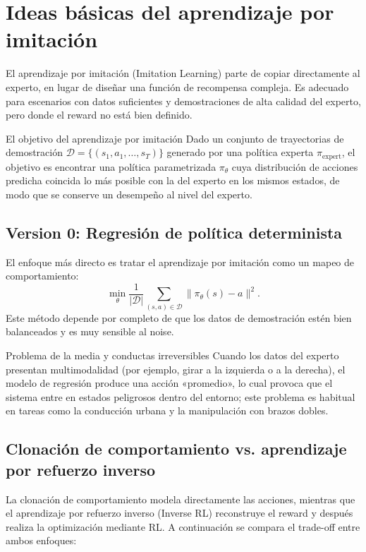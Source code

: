 \section{Ideas básicas del aprendizaje por imitación}

El aprendizaje por imitación (Imitation Learning) parte de copiar directamente al experto, en lugar de diseñar una función de recompensa compleja. Es adecuado para escenarios con datos suficientes y demostraciones de alta calidad del experto, pero donde el reward no está bien definido.

\begin{importantbox}{El objetivo del aprendizaje por imitación}
Dado un conjunto de trayectorias de demostración $\mathcal{D} = \{(s_1,a_1,\ldots,s_T)\}$ generado por una política experta $\pi_{\text{expert}}$, el objetivo es encontrar una política parametrizada $\pi_\theta$ cuya distribución de acciones predicha coincida lo más posible con la del experto en los mismos estados, de modo que se conserve un desempeño al nivel del experto.
\end{importantbox}

\subsection{Version 0: Regresión de política determinista}

El enfoque más directo es tratar el aprendizaje por imitación como un mapeo de comportamiento:
$$\min_\theta \frac{1}{|\mathcal{D}|}\sum_{(s,a) \in \mathcal{D}} \|\pi_\theta(s) - a\|^2.$$
Este método depende por completo de que los datos de demostración estén bien balanceados y es muy sensible al noise.

\begin{warningbox}{Problema de la media y conductas irreversibles}
Cuando los datos del experto presentan multimodalidad (por ejemplo, girar a la izquierda o a la derecha), el modelo de regresión produce una acción «promedio», lo cual provoca que el sistema entre en estados peligrosos dentro del entorno; este problema es habitual en tareas como la conducción urbana y la manipulación con brazos dobles.
\end{warningbox}

\subsection{Clonación de comportamiento vs. aprendizaje por refuerzo inverso}

La clonación de comportamiento modela directamente las acciones, mientras que el aprendizaje por refuerzo inverso (Inverse RL) reconstruye el reward y después realiza la optimización mediante RL. A continuación se compara el trade-off entre ambos enfoques:

